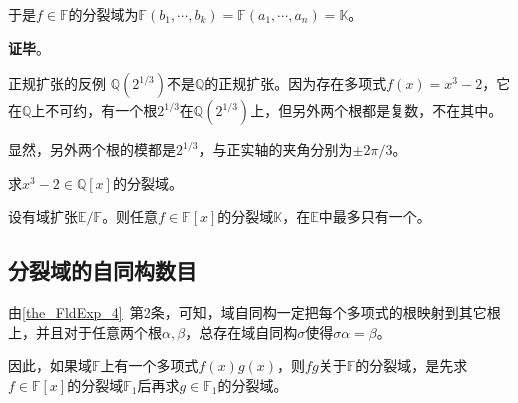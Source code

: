 于是$f\in\mathbb{F}$的分裂域为$\mathbb{F}(b_1, \cdots, b_k)=\mathbb{F}(a_1, \cdots, a_n)=\mathbb{K}$。

\textbf{证毕}。








\begin{example}{正规扩张的反例}
$\mathbb{Q}(2^{1/3})$不是$\mathbb{Q}$的正规扩张。因为存在多项式$f(x)=x^3-2$，它在$\mathbb{Q}$上不可约，有一个根$2^{1/3}$在$\mathbb{Q}(2^{1/3})$上，但另外两个根都是复数，不在其中。

显然，另外两个根的模都是$2^{1/3}$，与正实轴的夹角分别为$\pm 2\pi/3$。
\end{example}

\begin{exercise}{}
求$x^3-2\in\mathbb{Q}[x]$的分裂域。
\end{exercise}



\begin{corollary}{}
设有域扩张$\mathbb{E}/\mathbb{F}$。则任意$f\in\mathbb{F}[x]$的分裂域$\mathbb{K}$，在$\mathbb{E}$中最多只有一个。
\end{corollary}









\subsection{分裂域的自同构数目}

由\autoref{the_FldExp_4}~第2条，可知，域自同构一定把每个多项式的根映射到其它根上，并且对于任意两个根$\alpha, \beta$，总存在域自同构$\sigma$使得$\sigma \alpha=\beta$。

因此，如果域$\mathbb{F}$上有一个多项式$f(x)g(x)$，则$fg$关于$\mathbb{F}$的分裂域，是先求$f\in\mathbb{F}[x]$的分裂域$\mathbb{F}_1$后再求$g\in\mathbb{F}_1$的分裂域。


